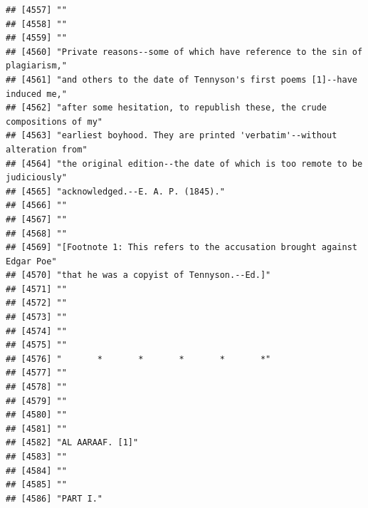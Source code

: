 \documentclass{article}\usepackage[]{graphicx}\usepackage[]{color}
\makeatletter
\newenvironment{kframe}{%
 \def\at@end@of@kframe{}%
 \ifinner\ifhmode%
  \def\at@end@of@kframe{\end{minipage}}%
  \begin{minipage}{\columnwidth}%
 \fi\fi%
 \def\FrameCommand##1{\hskip\@totalleftmargin \hskip-\fboxsep
 \colorbox{shadecolor}{##1}\hskip-\fboxsep
     \hskip-\linewidth \hskip-\@totalleftmargin \hskip\columnwidth}%
 \MakeFramed {\advance\hsize-\width
   \@totalleftmargin\z@ \linewidth\hsize
   \@setminipage}}%
 {\par\unskip\endMakeFramed%
 \at@end@of@kframe}
\newenvironment{knitrout}{}{} %
\makeatother
\begin{document}
\begin{knitrout}
\begin{kframe}
\begin{verbatim}
## [4557] ""                                                                            
## [4558] ""                                                                            
## [4559] ""                                                                            
## [4560] "Private reasons--some of which have reference to the sin of plagiarism,"     
## [4561] "and others to the date of Tennyson's first poems [1]--have induced me,"      
## [4562] "after some hesitation, to republish these, the crude compositions of my"     
## [4563] "earliest boyhood. They are printed 'verbatim'--without alteration from"      
## [4564] "the original edition--the date of which is too remote to be judiciously"     
## [4565] "acknowledged.--E. A. P. (1845)."                                             
## [4566] ""                                                                            
## [4567] ""                                                                            
## [4568] ""                                                                            
## [4569] "[Footnote 1: This refers to the accusation brought against Edgar Poe"        
## [4570] "that he was a copyist of Tennyson.--Ed.]"                                    
## [4571] ""                                                                            
## [4572] ""                                                                            
## [4573] ""                                                                            
## [4574] ""                                                                            
## [4575] ""                                                                            
## [4576] "       *       *       *       *       *"                                    
## [4577] ""                                                                            
## [4578] ""                                                                            
## [4579] ""                                                                            
## [4580] ""                                                                            
## [4581] ""                                                                            
## [4582] "AL AARAAF. [1]"                                                              
## [4583] ""                                                                            
## [4584] ""                                                                            
## [4585] ""                                                                            
## [4586] "PART I."                                                                     

\end{verbatim}
\end{kframe}
\end{knitrout}
\end{document}
